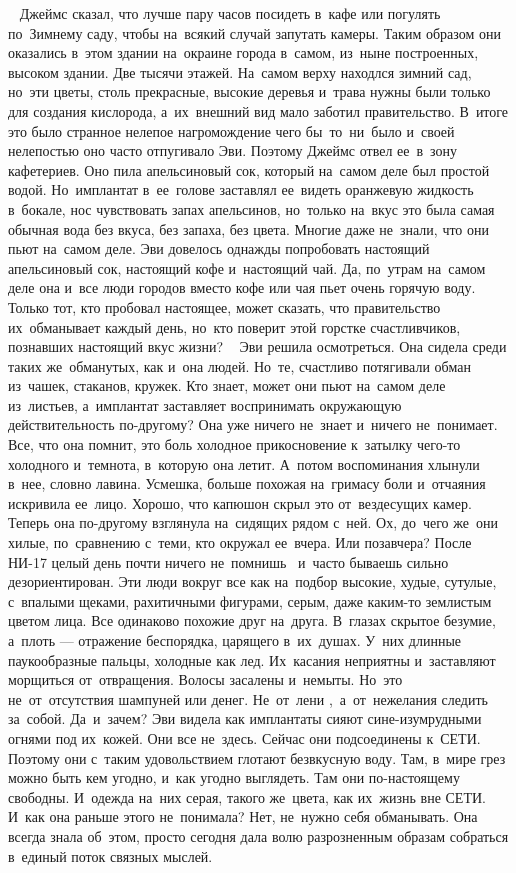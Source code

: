 ~
Джеймс сказал, что лучше пару часов посидеть в~кафе или погулять по~Зимнему саду, чтобы на~всякий случай запутать камеры.
Таким образом они оказались в~этом здании на~окраине города в~самом, из~ныне построенных, высоком здании.
Две тысячи этажей.
На~самом верху находлся зимний сад, но~эти цветы, столь прекрасные, высокие деревья и~трава нужны были только для создания кислорода, а~их~внешний вид мало заботил правительство.
В~итоге это было странное нелепое нагромождение чего бы~то~ни~было и~своей нелепостью оно часто отпугивало Эви.
Поэтому Джеймс отвел ее~в~зону кафетериев.
Оно пила апельсиновый сок, который на~самом деле был простой водой.
Но~имплантат в~ее~голове заставлял ее~видеть оранжевую жидкость в~бокале, нос чувствовать запах апельсинов, но~только на~вкус это была самая обычная вода без вкуса, без запаха, без цвета.
Многие даже не~знали, что они пьют на~самом деле.
Эви довелось однажды попробовать настоящий апельсиновый сок, настоящий кофе и~настоящий чай.
Да, по~утрам на~самом деле она и~все люди городов вместо кофе или чая пьет очень горячую воду.
Только тот, кто пробовал настоящее, может сказать, что правительство их~обманывает каждый день, но~кто поверит этой горстке счастливчиков, познавших настоящий вкус жизни? 
~
Эви решила осмотреться.
Она сидела среди таких же~обманутых, как и~она людей.
Но~те, счастливо потягивали обман из~чашек, стаканов, кружек.
Кто знает, может они пьют на~самом деле из~листьев, а~имплантат заставляет воспринимать окружающую действительность по-другому? Она уже ничего не~знает и~ничего не~понимает.
Все, что она помнит, это боль холодное прикосновение к~затылку чего-то холодного и~темнота, в~которую она летит.
А~потом воспоминания хлынули в~нее, словно лавина.
Усмешка, больше похожая на~гримасу боли и~отчаяния искривила ее~лицо.
Хорошо, что капюшон скрыл это от~вездесущих камер.
Теперь она по-другому взглянула на~сидящих рядом с~ней.
Ох, до~чего же~они хилые, по~сравнению с~теми, кто окружал ее~вчера.
Или позавчера? После НИ-17 целый день почти ничего не~помнишь ~и~часто бываешь сильно дезориентирован.
Эти люди вокруг все как на~подбор высокие, худые, сутулые, с~впалыми щеками, рахитичными фигурами, серым, даже каким-то землистым цветом лица.
Все одинаково похожие друг на~друга.
В~глазах скрытое безумие, а~плоть --- отражение беспорядка, царящего в~их~душах.
У~них длинные паукообразные пальцы, холодные как лед.
Их~касания неприятны и~заставляют морщиться от~отвращения.
Волосы засалены и~немыты.
Но~это не~от~отсутствия шампуней или денег.
Не~от~лени ,~а~от~нежелания следить за~собой.
Да~и~зачем? Эви видела как имплантаты сияют сине-изумрудными огнями под их~кожей.
Они все не~здесь.
Сейчас они подсоединены к~СЕТИ.
Поэтому они с~таким удовольствием глотают безвкусную воду.
Там, в~мире грез можно быть кем угодно, и~как угодно выглядеть.
Там они по-настоящему свободны.
И~одежда на~них серая, такого же~цвета, как их~жизнь вне СЕТИ.
И~как она раньше этого не~понимала? Нет, не~нужно себя обманывать.
Она всегда знала об~этом, просто сегодня дала волю разрозненным образам собраться в~единый поток связных мыслей.

